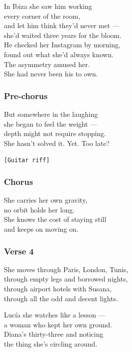 \documentclass[]{article}
\begin{document}
In Ibiza she saw him working\\
every corner of the room,\\
and let him think they'd never met ---\\
she'd waited three years for the bloom.\\
He checked her Instagram by morning,\\
found out what she'd always known.\\
The asymmetry amused her.\\
She had never been his to own.

\subsubsection{Pre-chorus}\label{pre-chorus-1}

But somewhere in the laughing\\
she began to feel the weight ---\\
depth might not require stopping.\\
She hasn't solved it. Yet. Too late?

\texttt{{[}Guitar\ riff{]}}

\subsubsection{Chorus}\label{chorus-6}

She carries her own gravity,\\
no orbit holds her long.\\
She knows the cost of staying still\\
and keeps on moving on.

\subsubsection{Verse 4}\label{verse-4-1}

She moves through Paris, London, Tunis,\\
through empty legs and borrowed nights,\\
through airport hotels with Susana,\\
through all the odd and decent lights.

Lucía she watches like a lesson ---\\
a woman who kept her own ground.\\
Diana's thirty-three and noticing\\
the thing she's circling around.
\end{document}
